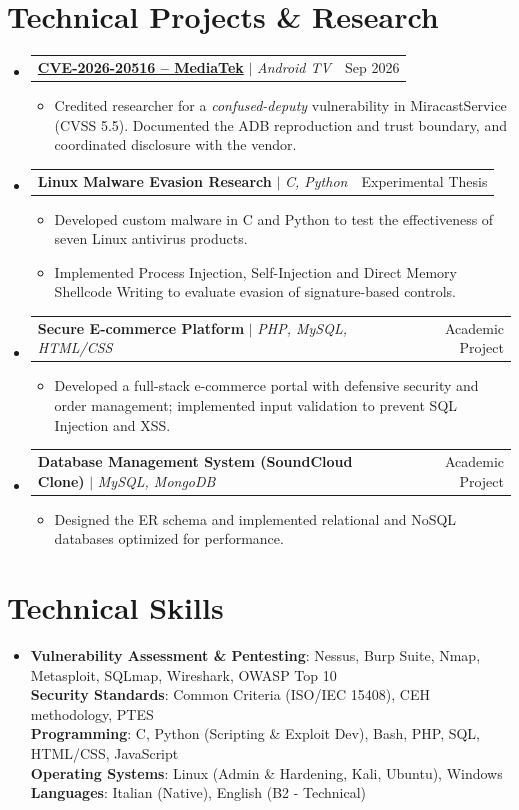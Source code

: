 \documentclass[letterpaper,11pt]{article}
\makeatletter
\newcommand{\resumeItem}[1]{\item\small{{#1\vspace{-2pt}}}}
\newcommand{\resumeProjectHeading}[2]{
  \item
  \begin{tabular*}{0.97\textwidth}{l@{\extracolsep{\fill}}r}
    \small#1 & #2 \\
  \end{tabular*}\vspace{-3pt}
}
\newcommand{\resumeSubHeadingListStart}{\begin{itemize}[leftmargin=0.15in,label={},topsep=3pt,itemsep=4pt,parsep=0pt]}
\newcommand{\resumeSubHeadingListEnd}{\end{itemize}}
\newcommand{\resumeItemListStart}{\begin{itemize}[topsep=3pt,itemsep=2pt,parsep=0pt]}
\newcommand{\resumeItemListEnd}{\end{itemize}\vspace{-5pt}}
\makeatother
\begin{document}
\section{Technical Projects \& Research}
\resumeSubHeadingListStart
  \resumeProjectHeading{\textbf{\href{https://dingo97.github.io/research/CVE-2026-20516/}{CVE-2026-20516 -- MediaTek}} $|$ \emph{Android TV}}{Sep 2026}
    \resumeItemListStart
      \resumeItem{Credited researcher for a \emph{confused-deputy} vulnerability in MiracastService (CVSS 5.5). Documented the ADB reproduction and trust boundary, and coordinated disclosure with the vendor.}
    \resumeItemListEnd
  \resumeProjectHeading{\textbf{Linux Malware Evasion Research} $|$ \emph{C, Python}}{Experimental Thesis}
    \resumeItemListStart
      \resumeItem{Developed custom malware in C and Python to test the effectiveness of seven Linux antivirus products.}
      \resumeItem{Implemented Process Injection, Self-Injection and Direct Memory Shellcode Writing to evaluate evasion of signature-based controls.}
    \resumeItemListEnd
  \resumeProjectHeading{\textbf{Secure E-commerce Platform} $|$ \emph{PHP, MySQL, HTML/CSS}}{Academic Project}
    \resumeItemListStart
      \resumeItem{Developed a full-stack e-commerce portal with defensive security and order management; implemented input validation to prevent SQL Injection and XSS.}
    \resumeItemListEnd
  \resumeProjectHeading{\textbf{Database Management System (SoundCloud Clone)} $|$ \emph{MySQL, MongoDB}}{Academic Project}
    \resumeItemListStart
      \resumeItem{Designed the ER schema and implemented relational and NoSQL databases optimized for performance.}
    \resumeItemListEnd
\resumeSubHeadingListEnd

\section{Technical Skills}
\begin{itemize}[leftmargin=0.15in,label={},topsep=3pt]
  \small\item{
    \textbf{Vulnerability Assessment \& Pentesting}: Nessus, Burp Suite, Nmap, Metasploit, SQLmap, Wireshark, OWASP Top 10 \\
    \textbf{Security Standards}: Common Criteria (ISO/IEC 15408), CEH methodology, PTES \\
    \textbf{Programming}: C, Python (Scripting \& Exploit Dev), Bash, PHP, SQL, HTML/CSS, JavaScript \\
    \textbf{Operating Systems}: Linux (Admin \& Hardening, Kali, Ubuntu), Windows \\
    \textbf{Languages}: Italian (Native), English (B2 - Technical)
  }
\end{itemize}
\end{document}
